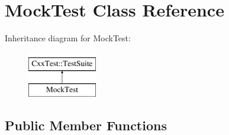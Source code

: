 \hypertarget{classMockTest}{\section{Mock\-Test Class Reference}
\label{classMockTest}
}
Inheritance diagram for Mock\-Test\-:\begin{figure}[H]
\begin{center}
\leavevmode
\includegraphics[height=2.000000cm]{classMockTest}
\end{center}
\end{figure}
\subsection*{Public Member Functions}
